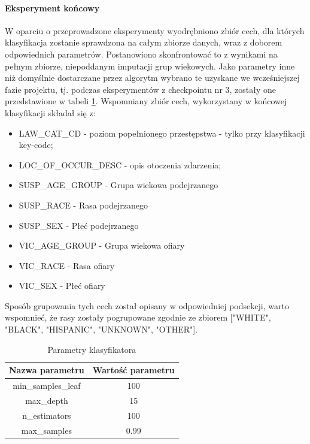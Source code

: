 \documentclass{classrep}
\begin{document}
{{{                \paragraph{Eksperyment końcowy} {
                    W oparciu o przeprowadzone eksperymenty wyodrębniono zbiór cech,
                    dla których klasyfikacja zostanie sprawdzona na całym zbiorze
                    danych, wraz z doborem odpowiednich parametrów. Postanowiono
                    skonfrontować to z wynikami na pełnym zbiorze, niepoddanym
                    imputacji grup wiekowych. Jako parametry inne niż domyślnie
                    dostarczane przez algorytm wybrano te uzyskane we wcześniejszej
                    fazie projektu, tj. podczas eksperymentów z checkpointu nr 3,
                    zostały one przedstawione w tabeli \ref{goal_1_exp_final_params}.
                    Wspomniany zbiór cech, wykorzystany w końcowej klasyfikacji składał
                    się z:
                    \begin{itemize}
                        \item LAW\_CAT\_CD - poziom popełnionego przestępstwa - tylko przy klasyfikacji key-code;
                        \item LOC\_OF\_OCCUR\_DESC - opis otoczenia zdarzenia;
                        \item SUSP\_AGE\_GROUP - Grupa wiekowa podejrzanego
                        \item SUSP\_RACE - Rasa podejrzanego
                        \item SUSP\_SEX - Płeć podejrzanego
                        \item VIC\_AGE\_GROUP - Grupa wiekowa ofiary
                        \item VIC\_RACE - Rasa ofiary
                        \item VIC\_SEX - Płeć ofiary
                    \end{itemize}
                    Sposób grupowania tych cech został opisany w odpowiedniej
                    podsekcji, warto wspomnieć, że rasy zostały pogrupowane zgodnie ze
                    zbiorem ["WHITE", "BLACK", "HISPANIC", "UNKNOWN", "OTHER"].
                    
                    \begin{table}
                    \small
                    \centering
                    \begin{tabular}{|c|c|}
                    \hline
                    Nazwa parametru & Wartość parametru \\ \hline
                        min\_samples\_leaf & 100\\ \hline
                        max\_depth & 15 \\ \hline
                        n\_estimators & 100 \\ \hline
                        max\_samples & 0.99  \\ \hline
                        \end{tabular}
                        \caption{Parametry klasyfikatora}
                        \label{goal_1_exp_final_params}
                     \end{table}

}}}}
\end{document}
